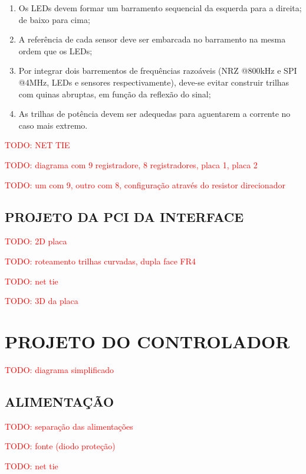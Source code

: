 \begin{enumerate}[label=\Roman*.]
    \item Os LEDs devem formar um barramento sequencial da esquerda para a direita; de baixo para cima;
    \item A referência de cada sensor deve ser embarcada no barramento na mesma ordem que os LEDs;
    \item Por integrar dois barrementos de frequências razoáveis (NRZ @800kHz e SPI @4MHz, LEDs e sensores respectivamente), deve-se evitar construir trilhas com quinas abruptas, em função da reflexão do sinal;
    \item As trilhas de potência devem ser adequedas para aguentarem a corrente no caso mais extremo.
\end{enumerate}



\textcolor{red}{TODO: NET TIE}

\textcolor{red}{TODO: diagrama com 9 registradore, 8 registradores, placa 1, placa 2}

\textcolor{red}{TODO: um com 9, outro com 8, configuração através do resistor direcionador}

\subsection{PROJETO DA PCI DA INTERFACE}
\label{subsec:pciinterface}

\textcolor{red}{TODO: 2D placa}

\textcolor{red}{TODO: roteamento trilhas curvadas, dupla face FR4}

\textcolor{red}{TODO: net tie}

\textcolor{red}{TODO: 3D da placa}

\section{PROJETO DO CONTROLADOR}
\label{sec:controlador}

\textcolor{red}{TODO: diagrama simplificado}

\subsection{ALIMENTAÇÃO}
\label{subsec:alimentacao}

\textcolor{red}{TODO: separação das alimentações}

\textcolor{red}{TODO: fonte (diodo proteção)}

\textcolor{red}{TODO: net tie}

